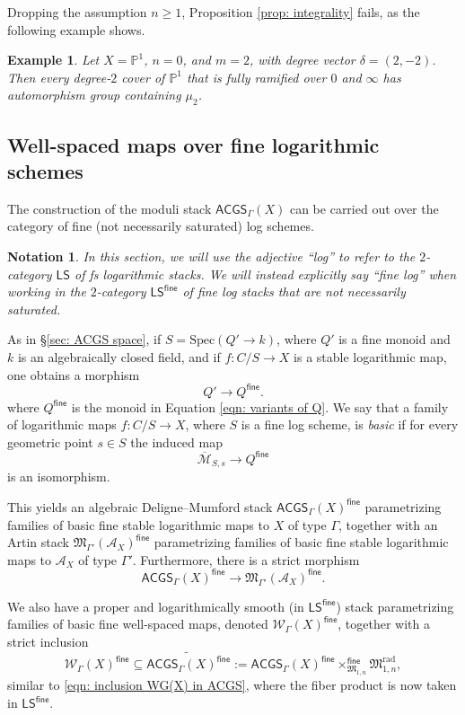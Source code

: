 \documentclass{article}
\def\oM{\overline{\mathcal{M}}}
\newtheorem{example}[definition]{Example}
\newtheorem{notation}[definition]{Notation}
\newcommand{\fine}{\mathsf{fine}}
\begin{document}
Dropping the assumption $n \geq 1$, Proposition \ref{prop: integrality} fails, as the following example shows.

\begin{example}
Let $X = \mathbb{P}^1$, $n = 0$, and $m = 2$, with degree vector $\delta = (2,-2)$. Then every degree-$2$ cover of $\mathbb{P}^1$ that is fully ramified over $0$ and $\infty$ has automorphism group containing $\mu_2$.
\end{example}


\subsection{Well-spaced maps over fine logarithmic schemes}

The construction of the moduli stack $\mathsf{ACGS}_{\Gamma}(X)$ can be carried out over the category of fine (not necessarily saturated) log schemes. 

\begin{notation}
In this section, we will use the adjective ``log'' to refer to the $2$-category $\mathsf{LS}$ of fs logarithmic stacks. We will instead explicitly say ``fine log'' when working in the $2$-category $\mathsf{LS}^{\mathsf{fine}}$ of fine log stacks that are not necessarily saturated. 
\end{notation}

As in \S\ref{sec: ACGS space}, if $S = \mathrm{Spec}(Q' \to k)$, where $Q'$ is a fine monoid and $k$ is an algebraically closed field, and if $f \colon C/S \to X$ is a stable logarithmic map, one obtains a morphism
\[
Q' \to Q^{\mathsf{fine}}.
\]
where $Q^\fine$ is the monoid in Equation \eqref{eqn: variants of Q}. We say that a family of logarithmic maps $f \colon C/S \to X$, where $S$ is a fine log scheme, is \emph{basic} if for every geometric point $s \in S$ the induced map
\[
\oM_{S,s} \to Q^{\mathsf{fine}}
\]
is an isomorphism.


This yields an algebraic Deligne--Mumford stack 
$\mathsf{ACGS}_{\Gamma}(X)^{\mathsf{fine}}$ parametrizing families of basic fine stable logarithmic maps to $X$ of type $\Gamma$, together with an Artin stack 
$\mathfrak{M}_{\Gamma'}(\mathcal{A}_X)^{\mathsf{fine}}$ parametrizing families of basic fine stable logarithmic maps to $\mathcal{A}_X$ of type $\Gamma'$. Furthermore, there is a strict morphism
\[
\mathsf{ACGS}_{\Gamma}(X)^{\mathsf{fine}} \longrightarrow \mathfrak{M}_{\Gamma'}(\mathcal{A}_X)^{\mathsf{fine}}.
\]

We also have a proper and logarithmically smooth (in $\mathsf{LS}^{\mathsf{fine}}$) stack parametrizing families of basic fine well-spaced maps, denoted $\mathcal{W}_\Gamma(X)^{\mathsf{fine}}$, together with a strict inclusion
\[
\mathcal{W}_\Gamma(X)^{\mathsf{fine}} \subseteq 
\widetilde{\mathsf{ACGS}_{\Gamma}(X)^{\mathsf{fine}}} 
:= \mathsf{ACGS}_{\Gamma}(X)^{\mathsf{fine}} 
\times_{\mathfrak{M}_{1,n}}^{\mathsf{fine}} \mathfrak{M}_{1,n}^{\mathrm{rad}},
\]
similar to \eqref{eqn: inclusion WG(X) in ACGS}, where the fiber product is now taken in $\mathsf{LS}^{\mathsf{fine}}$. 
\end{document}

